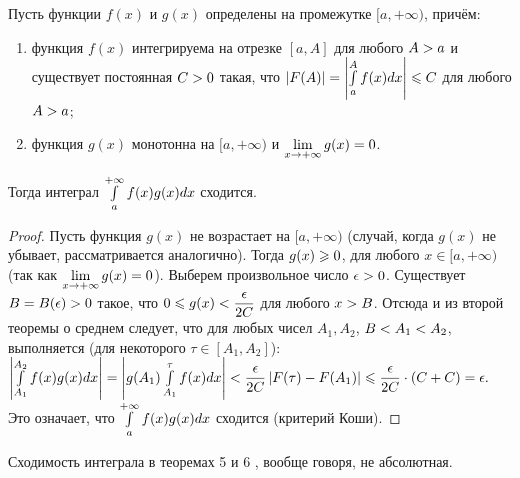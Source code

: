 \documentclass[a4paper,10pt]{article}
\begin{document}
	\begin{nthm} \label{thm6}
		 Пусть функции $f(x)$ и $g(x)$ определены на промежутке $[a, + \infty)$,
		 причём:
		 \begin{enumerate}
		 	\item функция $f(x)$ интегрируема на отрезке $[a, A]$ для любого
		 	 $A \hm{>} a$ и существует постоянная $C \hm{>} 0$ такая, что $\left|F(A)\right| \hm{=}
		 	 \left|\intl^{A}_a f(x)dx\right| \hm{\le} C$ для любого $A \hm{>} a$;
		 	\item функция $g(x)$ монотонна на $[a, + \infty)$ и
		 	 $\liml_{x \to + \infty} g(x) \hm{=} 0$.
		 \end{enumerate}
		 Тогда интеграл $\mathop{\int}\limits^{+ \infty}_a f(x)g(x)dx$ сходится.
	\end{nthm}
	\begin{proof}
		Пусть функция $g(x)$ не возрастает на $[a, + \infty)$
		 (случай, когда $g(x)$ не убывает, рассматривается
		 аналогично). Тогда $g(x) \hm{\ge} 0$, для любого $x \in
		 [a, + \infty)$ (так как $\liml_{x \to + \infty}
		 g(x) \hm{=} 0$). Выберем произвольное число $\epsilon \hm{>} 0$.
		 Существует $B\hm{=}B(\epsilon) \hm{>} 0$ такое, что $0 \hm{\le} g(x)
		 \hm{<} \dfrac{\epsilon}{2C}$ для любого $x \hm{>} B$. Отсюда и из
		 второй теоремы о среднем следует, что для любых чисел
		 $A_1, A_2$, $B \hm{<} A_1 \hm{<} A_2$, выполняется (для некоторого
		 $\tau \in [A_1, A_2]$):
		 $\left|\intl^{A_2}_{A_1} f(x)g(x)dx\right| \hm{=} \left|g(A_1)\intl^{\tau}_{A_1} f(x)dx\right|
		 \hm{<} \dfrac{\epsilon}{2C} \left|F(\tau) - F(A_1)\right| \hm{\le} \dfrac{\epsilon}{2C}\cdot(C+C) \hm{=}
		 \epsilon.$ Это означает, что $\mathop{\int}\limits^{+ \infty}_a f(x)g(x)dx$ сходится
		 (критерий Коши). %
	\end{proof}
	
	\begin{note}
		Сходимость интеграла в %
		теоремах 5 %
		и
		6%
		, вообще говоря, не абсолютная.
	\end{note}
	
\end{document}
